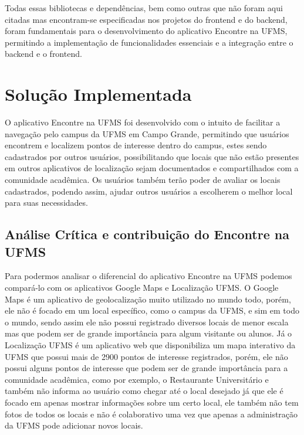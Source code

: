 \documentclass[12pt]{article}
\begin{document}
Todas essas bibliotecas e dependências, bem como outras que não foram aqui citadas mas encontram-se especificadas nos projetos do frontend e do backend, foram fundamentais para o desenvolvimento do aplicativo Encontre na UFMS, permitindo a implementação de funcionalidades essenciais e a integração entre o backend e o frontend.

\section{Solução Implementada}

O aplicativo Encontre na UFMS foi desenvolvido com o intuito de facilitar a navegação pelo campus da UFMS em Campo Grande, permitindo que usuários encontrem e localizem pontos de interesse dentro do campus, estes sendo cadastrados por outros usuários, possibilitando que locais que não estão presentes em outros aplicativos de localização sejam documentados e compartilhados com a comunidade acadêmica. Os usuários também terão poder de avaliar os locais cadastrados, podendo assim, ajudar outros usuários a escolherem o melhor local para suas necessidades.

\subsection{Análise Crítica e contribuição do Encontre na UFMS}
Para podermos analisar o diferencial do aplicativo Encontre na UFMS podemos compará-lo com os aplicativos Google Maps e Localização UFMS. O Google Maps é um aplicativo de geolocalização muito utilizado no mundo todo, porém, ele não é focado em um local específico, como o campus da UFMS, e sim em todo o mundo, sendo assim ele não possui registrado diversos locais de menor escala mas que podem ser de grande importância para algum visitante ou alunos. Já o Localização UFMS é um aplicativo web que disponibiliza um mapa interativo da UFMS que possui mais de 2900 pontos de interesse registrados, porém, ele não possui alguns pontos de interesse que podem ser de grande importância para a comunidade acadêmica, como por exemplo, o Restaurante Universitário e também não informa ao usuário como chegar até o local desejado já que ele é focado em apenas mostrar informações sobre um certo local, ele também não tem fotos de todos os locais e não é colaborativo uma vez que apenas a administração da UFMS pode adicionar novos locais.
\end{document}
